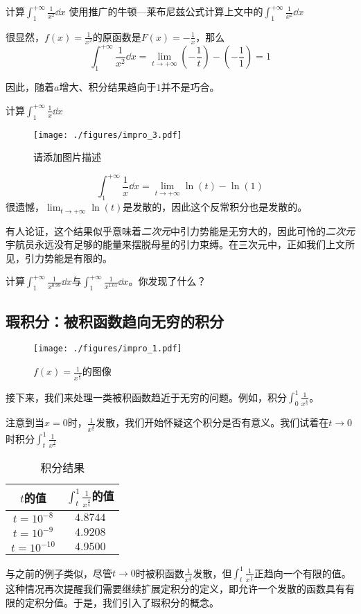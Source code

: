 \begin{example}{计算$\int^{+\infty}_1 \frac{1}{x^2} \dd x$}
使用推广的牛顿—莱布尼兹公式计算上文中的$\int^{+\infty}_1 \frac{1}{x^2} \dd x$

很显然，$f(x)=\frac{1}{x^2}$的原函数是$F(x)=-\frac{1}{x}$，那么
$$\int^{+\infty}_1 \frac{1}{x^2} \dd x=\lim_{t\rightarrow+\infty } (-\frac{1}{t}) - (-\frac{1}{1})=1$$

因此，随着$a$增大、积分结果趋向于$1$并不是巧合。
\end{example}

\begin{example}{计算$\int^{+\infty}_1 \frac{1}{x} \dd x$}
\begin{figure}[ht]
\centering
\texttt{[image: ./figures/impro\_3.pdf]}
\caption{请添加图片描述} \label{impro_fig3}
\end{figure}

$$\int^{+\infty}_1 \frac{1}{x} \dd x=\lim_{t\rightarrow+\infty } {\ln(t)} - \ln(1)$$
很遗憾，$\lim_{t\rightarrow+\infty } {\ln(t)} $是发散的，因此这个反常积分也是发散的。

有人论证，这个结果似乎意味着\textsl{二次元}中引力势能是无穷大的，因此可怜的\textsl{二次元}宇航员永远没有足够的能量来摆脱母星的引力束缚。在三次元中，正如我们上文所见，引力势能是有限的。

\end{example}

\begin{exercise}{}
计算$\int^{+\infty}_1 \frac{1}{x^{0.99}} \dd x$与$\int^{+\infty}_1 \frac{1}{x^{1.01}} \dd x$。你发现了什么？
\end{exercise}

\subsection{瑕积分：被积函数趋向无穷的积分}
\begin{figure}[ht]
\centering
\texttt{[image: ./figures/impro\_1.pdf]}
\caption{$f(x)=\frac{1}{x^{\frac{4}{5}}}$的图像} \label{impro_fig1}
\end{figure}
接下来，我们来处理一类被积函数趋近于无穷的问题。例如，积分$\int_0^1 \frac{1}{x^{\frac{4}{5}}}$。

注意到当$x=0$时，$\frac{1}{x^{\frac{4}{5}}}$发散，我们开始怀疑这个积分是否有意义。我们试着在$t\to0$时积分$\int_t^1 \frac{1}{x^{\frac{4}{5}}}$

\begin{table}[ht]
\centering
\caption{积分结果}\label{impro_tab2}
\begin{tabular}{|c|c|}
\hline
$t$的值 & $\int_t^1 \frac{1}{x^{\frac{4}{5}}}$的值 \\
\hline
$t=10^{-8}$ & $4.8744$ \\
\hline
$t=10^{-9}$  & $4.9208$ \\
\hline
$t=10^{-10}$  & $4.9500$ \\
\hline
\end{tabular}
\end{table}
与之前的例子类似，尽管$t\to0$时被积函数$\frac{1}{x^{\frac{4}{5}}}$发散，但$\int_t^1 \frac{1}{x^{\frac{4}{5}}}$正趋向一个有限的值。这种情况再次提醒我们需要继续扩展定积分的定义，即允许一个发散的函数具有有限的定积分值。于是，我们引入了瑕积分的概念。

